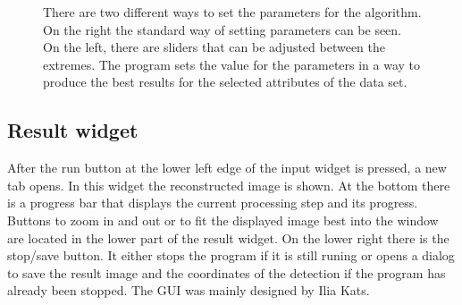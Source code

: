 \begin{figure}
\hfill
	\caption{There are two different ways to set the parameters for the algorithm. On the right the standard way of setting parameters can be seen. On the left, there are sliders that can be adjusted between the extremes. The program sets the value for the parameters in a way to produce the best results for the selected attributes of the data set.}
	\label{guiSettings}	
\end{figure}
\subsection{Result widget}
After the run button at the lower left edge of the input widget is pressed, a new tab opens. In this widget the reconstructed image is shown. At the bottom there is a progress bar that displays the current processing step and its progress. Buttons to zoom in and out or to fit the displayed image best into the window are located in the lower part of the result widget. On the lower right there is the stop/save button. It either stops the program if it is still runing or opens a dialog to save the result image and the coordinates of the detection if the program has already been stopped.\newline
The GUI was mainly designed by Ilia Kats.

